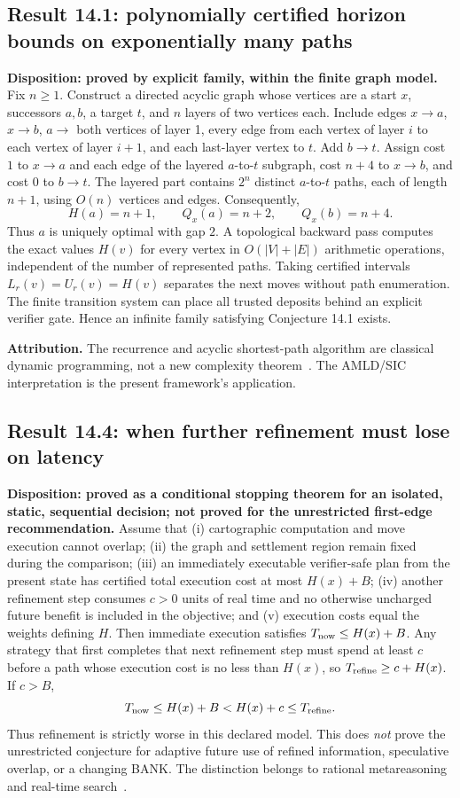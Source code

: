 \documentclass[11pt]{article}
\theoremstyle{definition}
\theoremstyle{remark}
\begin{document}
\subsection*{Result 14.1: polynomially certified horizon bounds on exponentially many paths}
\label{sec:settle141}
\textbf{Disposition: proved by explicit family, within the finite graph model.}
Fix $n\ge1$. Construct a directed acyclic graph whose vertices are a start $x$, successors $a,b$, a target $t$, and $n$ layers of two vertices each. Include edges $x\to a$, $x\to b$, $a\to$ both vertices of layer 1, every edge from each vertex of layer $i$ to each vertex of layer $i+1$, and each last-layer vertex to $t$. Add $b\to t$.
Assign cost $1$ to $x\to a$ and each edge of the layered $a$-to-$t$ subgraph, cost $n+4$ to $x\to b$, and cost $0$ to $b\to t$. The layered part contains $2^n$ distinct $a$-to-$t$ paths, each of length $n+1$, using $O(n)$ vertices and edges. Consequently,
\[
H(a)=n+1,\qquad Q_x(a)=n+2,\qquad Q_x(b)=n+4.
\]
Thus $a$ is uniquely optimal with gap $2$. A topological backward pass computes the exact values $H(v)$ for every vertex in $O(|V|+|E|)$ arithmetic operations, independent of the number of represented paths. Taking certified intervals $L_r(v)=U_r(v)=H(v)$ separates the next moves without path enumeration. The finite transition system can place all trusted deposits behind an explicit verifier gate. Hence an infinite family satisfying Conjecture 14.1 exists.

\textbf{Attribution.} The recurrence and acyclic shortest-path algorithm are classical dynamic programming, not a new complexity theorem~\cite{bellman,astar}. The AMLD/SIC interpretation is the present framework's application.

\subsection*{Result 14.4: when further refinement must lose on latency}
\label{sec:settle144}
\textbf{Disposition: proved as a conditional stopping theorem for an isolated, static, sequential decision; not proved for the unrestricted first-edge recommendation.}
Assume that (i) cartographic computation and move execution cannot overlap; (ii) the graph and settlement region remain fixed during the comparison; (iii) an immediately executable verifier-safe plan from the present state has certified total execution cost at most $H(x)+B$; (iv) another refinement step consumes $c>0$ units of real time and no otherwise uncharged future benefit is included in the objective; and (v) execution costs equal the weights defining $H$.
Then immediate execution satisfies $T_{\rm now}\le H(x)+B$. Any strategy that first completes that next refinement step must spend at least $c$ before a path whose execution cost is no less than $H(x)$, so $T_{\rm refine}\ge c+H(x)$. If $c>B$,
\[
T_{\rm now}\le H(x)+B < H(x)+c\le T_{\rm refine}.
\]
Thus refinement is strictly worse in this declared model. This does \emph{not} prove the unrestricted conjecture for adaptive future use of refined information, speculative overlap, or a changing BANK. The distinction belongs to rational metareasoning and real-time search~\cite{russell,korf}.
\end{document}
